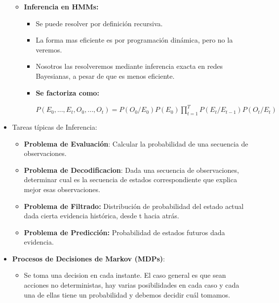 \documentclass[12pt, twoside, openright]{report} %
\begin{document}
\begin{itemize}
\begin{itemize}
    \item \textbf{Inferencia en HMMs:}
      

      \begin{itemize}
      \item Se puede resolver por definición recursiva.
        
      \item La forma mas eficiente es por programación dinámica, pero no la
        veremos.
        
      \item Nosotros las resolveremos mediante inferencia exacta en redes
        Bayesianas, a pesar de que es menos eficiente.
        
      \item \textbf{Se factoriza como:} 
	  
	  $P(E_0, ..., E_t, O_0, ..., O_t) = P(O_0/E_0)P(E_0) \prod^T_{t=1} P(E_t/ E_{t-1})P(O_t/E_t)$
        
      \end{itemize}
    \end{itemize}

	\pagebreak
  \item Tareas típicas de Inferencia:
    

    \begin{itemize}
    \item \textbf{Problema de Evaluación}: Calcular la probabilidad de una
      secuencia de observaciones.
      
    \item \textbf{Problema de Decodificacion}: Dada una secuencia de
      observaciones, determinar cual es la secuencia de estados
      correspondiente que explica mejor esas observaciones.
      
    \item \textbf{Problema de Filtrado:} Distribución de probabilidad del
      estado actual dada cierta evidencia histórica, desde t hacia
      atrás.
      
    \item \textbf{Problema de Predicción:} Probabilidad de estados futuros
      dada evidencia.
      
    \end{itemize}
  \item \textbf{Procesos de Decisiones de Markov (MDPs)}:
    

    \begin{itemize}
    \item Se toma una decision en cada instante. El caso general es que sean
      acciones no deterministas, hay varias posibilidades en cada caso y
      cada una de ellas tiene un probabilidad y debemos decidir cuál
      tomamos.
      

\end{itemize}
\end{itemize}
\end{document}
